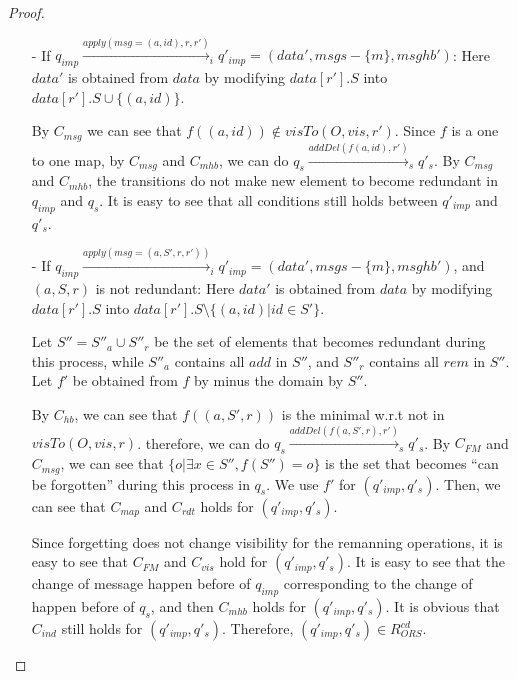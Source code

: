 \begin {proof}
\begin{itemize}
\item[-] If $q_{\mathit{imp}} \xrightarrow{\mathit{apply}( \mathit{msg}=(a,\mathit{id}),r,r' )}_i q'_{\mathit{imp}} = (\mathit{data}',\mathit{msgs} - \{ m \},\mathit{msghb}')$: Here $\mathit{data}'$ is obtained from $\mathit{data}$ by modifying $\mathit{data}[r'].S$ into $\mathit{data}[r'].S \cup \{ (a,\mathit{id}) \}$.

    By $C_{\mathit{msg}}$ we can see that $f((a,\mathit{id})) \notin \mathit{visTo}(O,\mathit{vis},r')$. Since $f$ is a one to one map, by $C_{\mathit{msg}}$ and $C_{\mathit{mhb}}$, we can do $q_s \xrightarrow{\mathit{addDel}( f(a,\mathit{id}),r' )}_s q'_s$. By $C_{\mathit{msg}}$ and $C_{\mathit{mhb}}$, the transitions do not make new element to become redundant in $q_{\mathit{imp}}$ and $q_s$. It is easy to see that all conditions still holds between $q'_{\mathit{imp}}$ and $q'_s$.

\item[-] If $q_{\mathit{imp}} \xrightarrow{\mathit{apply}( \mathit{msg}=(a,S',r,r' ))}_i q'_{\mathit{imp}} = (\mathit{data}',\mathit{msgs} - \{ m \},\mathit{msghb}')$, and $(a,S,r)$ is not redundant: Here $\mathit{data}'$ is obtained from $\mathit{data}$ by modifying $\mathit{data}[r'].S$ into $\mathit{data}[r'].S \setminus \{ (a,\mathit{id}) \vert \mathit{id} \in S'\}$.

    Let $S'' = S''_a \cup S''_r$ be the set of elements that becomes redundant during this process, while $S''_a$ contains all $\mathit{add}$ in $S''$, and $S''_r$ contains all $\mathit{rem}$ in $S''$. Let $f'$ be obtained from $f$ by minus the domain by $S''$.

    By $C_{\mathit{hb}}$, we can see that $f((a,S',r))$ is the minimal w.r.t not in $\mathit{visTo}(O,\mathit{vis},r)$. therefore, we can do $q_s \xrightarrow{\mathit{addDel}( f(a,S',r),r' )}_s q'_s$. By $C_{\mathit{FM}}$ and $C_{\mathit{msg}}$, we can see that $\{ o \vert \exists x \in S'', f(S'') = o \}$ is the set that becomes ``can be forgotten'' during this process in $q_s$. We use $f'$ for $(q'_{\mathit{imp}},q'_s)$. Then, we can see that $C_{\mathit{map}}$ and $C_{\mathit{rdt}}$ holds for $(q'_{\mathit{imp}},q'_s)$.

    Since forgetting does not change visibility for the remanning operations, it is easy to see that $C_{\mathit{FM}}$ and $C_{\mathit{vis}}$ hold for $(q'_{\mathit{imp}},q'_s)$. It is easy to see that the change of message happen before of $q_{\mathit{imp}}$ corresponding to the change of happen before of $q_s$, and then $C_{\mathit{mhb}}$ holds for $(q'_{\mathit{imp}},q'_s)$. It is obvious that $C_{\mathit{ind}}$ still holds for $(q'_{\mathit{imp}},q'_s)$. Therefore, $(q'_{\mathit{imp}},q'_s) \in R_{\mathit{ORS}}^{\mathit{cd}}$.


\end{itemize}
\end{proof}
